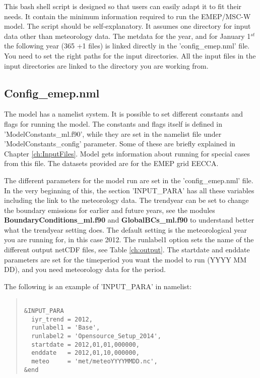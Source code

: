 This bash shell script is designed so that users can easily 
adapt it to fit their needs. It contain the minimum information 
required to run the EMEP/MSC-W model. 
The script should be self-explanatory. It assumes one directory for input data other than meteorology data. 
The metdata for the year, and for January 1$^{st}$ the following year (365 +1 files) is linked directly in the
'config\_emep.nml' file. 
You need to set the right paths 
for the input directories.  
All the input files in the input directories are linked to the directory you are working from. 

\subsection{Config\_emep.nml}

The model has a namelist system.  It is possible to set different constants and 
flags for running the model.  The constants and flags itself
is defined in 'ModelConstants\_ml.f90', while they are set in the namelist file under
'ModelConstants\_config' parameter. 
Some of these are briefly explained in Chapter \ref{ch:InputFiles}. 
 Model gets information about running for special cases from this 
file.  The datasets provided are for the EMEP grid EECCA. 

The different parameters for the model run are set in the 'config\_emep.nml' file.  In the very beginning 
of this, the section 'INPUT\_PARA' has all these variables including the link to the meteorology data. 
The trendyear can be set to change the boundary emissions for 
earlier and future years, see the modules {\bf BoundaryConditions\_ml.f90 } 
and {\bf GlobalBCs\_ml.f90 } to understand better what the trendyear 
setting does. The default setting is the meteorological year you are running for, in this case 2012. 
The runlabel1 option sets the name of the different output netCDF 
files, see Table \ref{ch:output}. 
The startdate and enddate parameters are set for the timeperiod you want the model 
to run (YYYY MM DD), and you need meteorology data for the period.

The following is an example of 'INPUT\_PARA' in namelist:

\begin{quote}
\begin{verbatim}

&INPUT_PARA
  iyr_trend = 2012,
  runlabel1 = 'Base',
  runlabel2 = 'Opensource_Setup_2014',
  startdate = 2012,01,01,000000,
  enddate   = 2012,01,10,000000,
  meteo     = 'met/meteoYYYYMMDD.nc',
&end

\end{verbatim}
\end{quote}
 
